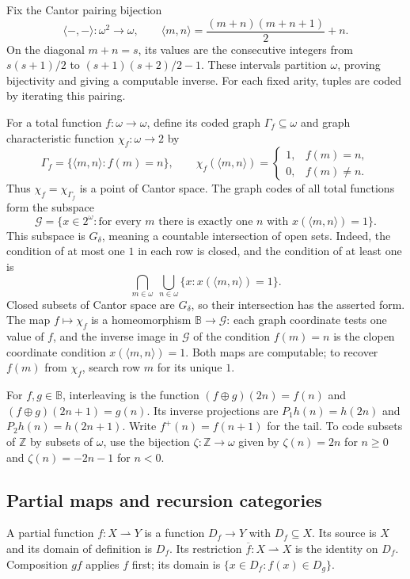 \documentclass[11pt]{article}
\theoremstyle{definition}
\newcommand{\Baire}{\mathbb B}
\begin{document}
Fix the Cantor pairing bijection
\begin{equation}\label{eq:cantor-pair}
 \langle-,-\rangle:\omega^2\longrightarrow\omega,
 \qquad
 \langle m,n\rangle=\frac{(m+n)(m+n+1)}2+n.
\end{equation}
On the diagonal $m+n=s$, its values are the consecutive integers
from $s(s+1)/2$ to $(s+1)(s+2)/2-1$. These intervals partition
$\omega$, proving bijectivity and giving a computable inverse.
For each fixed arity, tuples are coded by iterating this pairing.

For a total function $f:\omega\to\omega$, define its coded graph
$\Gamma_f\subseteq\omega$ and graph characteristic function
$\chi_f:\omega\to2$ by
\begin{equation}\label{eq:graph-code}
 \Gamma_f=\{\langle m,n\rangle:f(m)=n\},\qquad
 \chi_f(\langle m,n\rangle)=
 \begin{cases}1,&f(m)=n,\\0,&f(m)\ne n.\end{cases}
\end{equation}
Thus $\chi_f=\chi_{\Gamma_f}$ is a point of Cantor space. The
graph codes of all total functions form the subspace
\[
 \mathcal G=\{x\in2^\omega:
       \text{for every }m\text{ there is exactly one }n
       \text{ with }x(\langle m,n\rangle)=1\}.
\]
This subspace is $G_\delta$, meaning a countable intersection of
open sets. Indeed, the condition of at most one $1$ in each row is
closed, and the condition of at least one is
\[
 \bigcap_{m\in\omega}\ \bigcup_{n\in\omega}
       \{x:x(\langle m,n\rangle)=1\}.
\]
Closed subsets of Cantor space are $G_\delta$, so their intersection
has the asserted form. The map $f\mapsto\chi_f$ is a homeomorphism
$\Baire\to\mathcal G$: each graph coordinate tests one value of
$f$, and the inverse image in $\mathcal G$ of the condition
$f(m)=n$ is the clopen coordinate condition
$x(\langle m,n\rangle)=1$. Both maps are computable; to recover
$f(m)$ from $\chi_f$, search row $m$ for its unique $1$.

For $f,g\in\Baire$, interleaving is the function
$(f\oplus g)(2n)=f(n)$ and $(f\oplus g)(2n+1)=g(n)$.
Its inverse projections are $P_1h(n)=h(2n)$ and
$P_2h(n)=h(2n+1)$. Write $f^+(n)=f(n+1)$ for the tail.
To code subsets of $\mathbb Z$ by subsets of $\omega$, use the
bijection $\zeta:\mathbb Z\to\omega$ given by
$\zeta(n)=2n$ for $n\geq0$ and $\zeta(n)=-2n-1$ for $n<0$.

\subsection{Partial maps and recursion categories}\label{sec:partial}
A partial function $f:X\rightharpoonup Y$ is a function
$D_f\to Y$ with $D_f\subseteq X$. Its source is $X$ and its
domain of definition is $D_f$. Its restriction $\overline f:X\rightharpoonup X$
is the identity on $D_f$. Composition $gf$ applies $f$ first;
its domain is $\{x\in D_f:f(x)\in D_g\}$.
\end{document}
